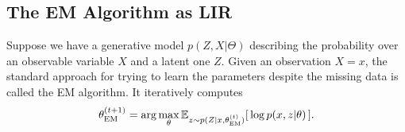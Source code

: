 
\subsection{The EM Algorithm as LIR}
Suppose we have a generative model $p(Z,X | \Theta)$
describing the probability over an observable variable $X$ and a latent one $Z$.
%
Given an observation $X{=}x$,
the standard approach for trying to learn the parameters despite
the missing data is called the EM algorithm. It iteratively computes
\[
    \theta^{(t+1)}_{\text{EM}}
            = \arg\max_{\theta} \operatorname*{\mathbb{E}}\nolimits_{z\sim p(Z|x,\theta_{\text{EM}}^{(t)})}[ \,\log p(x, z | \theta) \,].
\]

